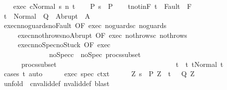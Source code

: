 \begin{isabellebody}
\ \ \isamarkupfalse%
\ exec{\isacharcolon}\ {\isachardoublequoteopen}{\isasymGamma}{\isasymturnstile}{\isasymlangle}c{\isacharcomma}Normal\ s{\isasymrangle}\ {\isacharequal}n{\isasymRightarrow}\ t{\isachardoublequoteclose}\isanewline
\ \ \isamarkupfalse%
\ P{\isacharcolon}\ {\isachardoublequoteopen}s\ {\isasymin}\ P{\isachardoublequoteclose}\isanewline
\ \ \isamarkupfalse%
\ t{\isacharunderscore}notin{\isacharunderscore}F{\isacharcolon}\ {\isachardoublequoteopen}t\ {\isasymnotin}\ Fault\ {\isacharbackquote}\ F{\isachardoublequoteclose}\isanewline
\ \ \isamarkupfalse%
\ {\isachardoublequoteopen}t\ {\isasymin}\ Normal\ {\isacharbackquote}\ Q\ {\isasymunion}\ Abrupt\ {\isacharbackquote}\ A{\isachardoublequoteclose}\isanewline
\ \ \isamarkupfalse%
\ {\isacharminus}\isanewline
\ \ \ \ \isamarkupfalse%
\ execn{\isacharunderscore}noguards{\isacharunderscore}no{\isacharunderscore}Fault\ {\isacharbrackleft}OF\ exec\ noguards{\isacharunderscore}c\ noguards{\isacharunderscore}{\isasymGamma}{\isacharbrackright}\isanewline
\ \ \ \ \ execn{\isacharunderscore}nothrows{\isacharunderscore}no{\isacharunderscore}Abrupt\ {\isacharbrackleft}OF\ exec\ nothrows{\isacharunderscore}c\ nothrows{\isacharunderscore}{\isasymGamma}\ {\isacharbrackright}\isanewline
\ \ \ \ \ execn{\isacharunderscore}noSpec{\isacharunderscore}no{\isacharunderscore}Stuck\ {\isacharbrackleft}OF\ exec\ \ \isanewline
\ \ \ \ \ \ \ \ \ \ \ \ \ \ noSpec{\isacharunderscore}c\ \ noSpec{\isacharunderscore}{\isasymGamma}\ procs{\isacharunderscore}subset\ \isanewline
\ \ \ \ \ \ procs{\isacharunderscore}subset{\isacharunderscore}{\isasymGamma}{\isacharbrackright}\ \ \ \ \ \ \ \ \ \ \ \ \ \ \ \ \ \ \ \ \ \ \ \ \ \ \ \ \isanewline
\ \ \ \ \isamarkupfalse%
\ t{\isacharprime}\ \ t{\isacharcolon}\ {\isachardoublequoteopen}t{\isacharequal}Normal\ t{\isacharprime}{\isachardoublequoteclose}\isanewline
\ \ \ \ \ \ \isamarkupfalse%
\ {\isacharparenleft}cases\ t{\isacharparenright}\ auto\isanewline
\ \ \ \ \isamarkupfalse%
\ exec\ spec\ ctxt\isanewline
\ \ \ \ \isamarkupfalse%
\ {\isachardoublequoteopen}{\isacharparenleft}{\isasymforall}Z{\isachardot}\ s\ {\isasymin}\ P{\isacharprime}\ Z\ {\isasymlongrightarrow}\ t{\isacharprime}\ {\isasymin}\ \ Q{\isacharprime}\ Z{\isacharparenright}{\isachardoublequoteclose}\isanewline
\ \ \ \ \ \ \isamarkupfalse%
\ {\isacharparenleft}unfold\ \ cnvalid{\isacharunderscore}def\ nvalid{\isacharunderscore}def{\isacharparenright}\ blast\isanewline

\end{isabellebody}
